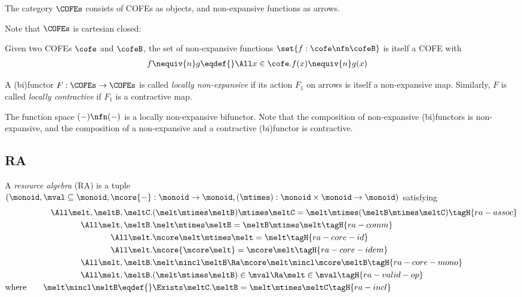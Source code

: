 \begin{defn}
  The category $\COFEs$ consists of COFEs as objects, and non-expansive functions as arrows.
\end{defn}

Note that $\COFEs$ is cartesian closed:
\begin{defn}
  Given two COFEs $\cofe$ and $\cofeB$, the set of non-expansive functions $\set{f : \cofe \nfn \cofeB}$ is itself a COFE with
  \begin{align*}
    f \nequiv{n} g \eqdef{}& \All x \in \cofe. f(x) \nequiv{n} g(x)
  \end{align*}
\end{defn}

\begin{defn}
  A (bi)functor $F : \COFEs \to \COFEs$ is called \emph{locally non-expansive} if its action $F_1$ on arrows is itself a non-expansive map.
  Similarly, $F$ is called \emph{locally contractive} if $F_1$ is a contractive map.
\end{defn}
The function space $(-) \nfn (-)$ is a locally non-expansive bifunctor.
Note that the composition of non-expansive (bi)functors is non-expansive, and the composition of a non-expansive and a contractive (bi)functor is contractive.

\subsection{RA}

\begin{defn}
  A \emph{resource algebra} (RA) is a tuple \\
  $(\monoid, \mval \subseteq \monoid, \mcore{-}:
  \monoid \to \monoid, (\mtimes) : \monoid \times \monoid \to \monoid)$ satisfying
  \begin{align*}
    \All \melt, \meltB, \meltC.& (\melt \mtimes \meltB) \mtimes \meltC = \melt \mtimes (\meltB \mtimes \meltC) \tagH{ra-assoc} \\
    \All \melt, \meltB.& \melt \mtimes \meltB = \meltB \mtimes \melt \tagH{ra-comm} \\
    \All \melt.& \mcore\melt \mtimes \melt = \melt \tagH{ra-core-id} \\
    \All \melt.& \mcore{\mcore\melt} = \mcore\melt \tagH{ra-core-idem} \\
    \All \melt, \meltB.& \melt \mincl \meltB \Ra \mcore\melt \mincl \mcore\meltB \tagH{ra-core-mono} \\
    \All \melt, \meltB.& (\melt \mtimes \meltB) \in \mval \Ra \melt \in \mval \tagH{ra-valid-op} \\
    \text{where}\qquad %
    \melt \mincl \meltB \eqdef{}& \Exists \meltC. \meltB = \melt \mtimes \meltC \tagH{ra-incl}
  \end{align*}
\end{defn}

